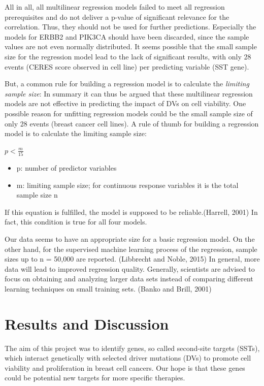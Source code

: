 \documentclass[]{article}
\providecommand{\tightlist}{%
  \setlength{\itemsep}{0pt}\setlength{\parskip}{0pt}}
\begin{document}
All in all, all multilinear regression models failed to meet all
regression prerequisites and do not deliver a p-value of significant
relevance for the correlation. Thus, they should not be used for further
predictions. Especially the models for ERBB2 and PIK3CA should have been
discarded, since the sample values are not even normally distributed. It
seems possible that the small sample size for the regression model lead
to the lack of significant results, with only 28 events (CERES score
observed in cell line) per predicting variable (SST gene).

But, a common rule for building a regression model is to calculate the
\emph{limiting sample size}: In summary it can thus be argued that these
multilinear regression models are not effective in predicting the impact
of DVs on cell viability. One possible reason for unfitting regression
models could be the small sample size of only 28 events (breast cancer
cell lines). A rule of thumb for building a regression model is to
calculate the limiting sample size:

\(p < \frac{m}{15}\)

\begin{itemize}
\tightlist
\item
  p: number of predictor variables
\item
  m: limiting sample size; for continuous response variables it is the
  total sample size n
\end{itemize}

If this equation is fulfilled, the model is supposed to be
reliable.(Harrell, 2001) In fact, this condition is true for all four
models.

Our data seems to have an appropriate size for a basic regression model.
On the other hand, for the supervised machine learning process of the
regression, sample sizes up to n = 50,000 are reported. (Libbrecht and
Noble, 2015) In general, more data will lead to improved regression
quality. Generally, scientists are advised to focus on obtaining and
analyzing larger data sets instead of comparing different learning
techniques on small training sets. (Banko and Brill, 2001)

\hypertarget{results-and-discussion}{%
\section{Results and Discussion}\label{results-and-discussion}}

The aim of this project was to identify genes, so called second-site
targets (SSTs), which interact genetically with selected driver
mutations (DVs) to promote cell viability and proliferation in breast
cell cancers. Our hope is that these genes could be potential new
targets for more specific therapies.
\end{document}
